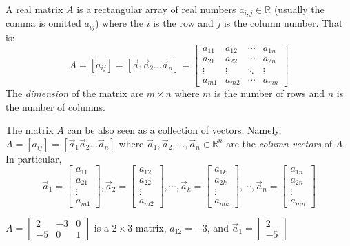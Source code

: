 \begin{definition}
A real matrix $A$ is a rectangular array of real numbers $a_{i,j} \in 
\mathbb{R}$ (usually the comma is omitted $a_{ij}$)  where the $i$ is the row 
and $j$ is the column number. That is:
\[
A=[a_{ij}]=[\vec{a}_1 \vec{a}_2 \ldots \vec{a}_n]=
\begin{bmatrix}
a_{11} & a_{12} & \cdots & a_{1n} \\
a_{21} & a_{22} & \cdots & a_{2n} \\
\vdots & \vdots & \ddots & \vdots \\
a_{m1} & a_{m2} & \cdots & a_{mn} 
\end{bmatrix}
\]
The \emph{dimension} of the matrix are $m\times n$ where $m$ is the number of 
rows and $n$ is the number of columns. 
\end{definition}
The matrix $A$ can be also seen as a collection of vectors. Namely, 
$A=[a_{ij}]=[\vec{a}_1 \vec{a}_2 \ldots \vec{a}_n]$ where 
 $\vec{a}_1, \vec{a}_2,\ldots, \vec{a}_n \in \mathbb{R}^n$ are the \emph{column 
vectors} of $A$. In particular, 
\[
\vec{a}_1=\begin{bmatrix}a_{11}\\a_{21}\\ \vdots \\ a_{m1}\end{bmatrix},
\vec{a}_2=\begin{bmatrix}a_{12}\\a_{22}\\ \vdots \\ a_{m2}\end{bmatrix}, \cdots,
\vec{a}_k=\begin{bmatrix}a_{1k}\\a_{2k}\\ \vdots \\ a_{mk}\end{bmatrix}, \cdots,
\vec{a}_n=\begin{bmatrix}a_{1n}\\a_{2n}\\ \vdots \\ a_{mn}\end{bmatrix}
\]

\begin{example}
$A=\begin{bmatrix}
2 & -3 & 0 \\
-5 & 0 & 1 
\end{bmatrix}$
is a $2 \times 3$ matrix, $a_{12}=-3$, and  
$\vec{a}_1=\begin{bmatrix} 2 \\ -5 
\end{bmatrix}$
\end{example}


